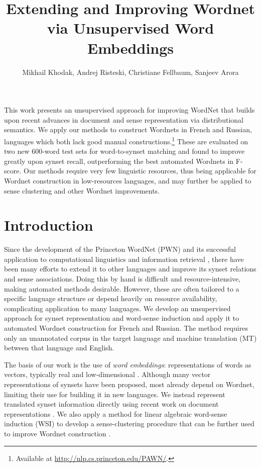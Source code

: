 \documentclass{book}
\title       {Extending and Improving Wordnet via Unsupervised Word Embeddings}
\author      {Mikhail Khodak,
              Andrej Risteski,
              Christiane Fellbaum,
              Sanjeev Arora\affiliation{Princeton University}}
\begin{document}
This work presents an unsupervised approach for improving WordNet that builds upon recent advances in document and sense representation via distributional semantics.
We apply our methods to construct Wordnets in French and Russian, languages which both lack good manual constructions.\footnote{Available at \url{http://nlp.cs.princeton.edu/PAWN/}.}
These are evaluated on two new 600-word test sets for word-to-synset matching and found to improve greatly upon synset recall, outperforming the best automated Wordnets in F-score.
Our methods require very few linguistic resources, thus being applicable for Wordnet construction in low-resources languages, and may further be applied to sense clustering and other Wordnet improvements.

\section{Introduction}
\label{sec:intro}

Since the development of the Princeton WordNet (PWN) and its successful application to computational linguistics and information retrieval \citep{Fellbaum:98}, there have been many efforts to extend it to other languages and improve its synset relations and sense associations.
Doing this by hand is difficult and resource-intensive, making automated methods desirable.
However, these are often tailored to a specific language structure or depend heavily on resource availability, complicating application to many languages.
We develop an unsupervised approach for synset representation and word-sense induction and apply it to automated Wordnet construction for French and Russian.
The method requires only an unannotated corpus in the target language and machine translation (MT) between that language and English.

The basis of our work is the use of {\em word embeddings}: representations of words as vectors, typically real and low-dimensional \citep{Turney:10}. 
Although many vector representations of synsets have been proposed, most already depend on Wordnet, limiting their use for building it in new languages.
We instead represent translated synset information directly using recent work on document representations \citep{sentence}.
We also apply a method for linear algebraic word-sense induction (WSI) to develop a sense-clustering procedure that can be further used to improve Wordnet construction \citep{polysemy}.
\end{document}
